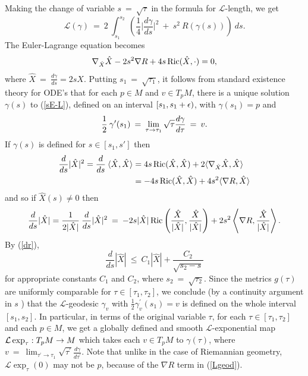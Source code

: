 Making the change of variable $s \: = \: \sqrt{\tau}$ in the formula
for ${\mathcal L}$-length, we get
\begin{equation}
\label{changetos}
{\mathcal L}(\gamma) \: = \:
2 \: \int_{s_1}^{s_2} \: \left( \frac14
\Big| \frac{d\gamma}{ds} \Big|^2 \: + \:
s^2 \: R(\gamma(s)) \right) \: ds.
\end{equation}
The Euler-Lagrange equation becomes
\begin{equation}
\label{sE-L}
\nabla_{\hat X}\hat X-2s^2\nabla R+4s\operatorname{Ric}(\hat X,\cdot)=0,
\end{equation}
where $\hat X \: = \: \frac{d\gamma}{ds}=2sX$.
Putting $s_1 \: = \: \sqrt{\tau_1}$,
it follows from standard existence theory
for ODE's that for each $p \in M$ and $v\in T_pM$,
there is a unique solution $\gamma(s)$ to
(\ref{sE-L}), defined on an interval $[s_1,s_1+\epsilon)$, with $\gamma(s_1) = p$
and
\begin{equation}
\frac{1}{2} \: \gamma^\prime(s_1) \: = \:
\lim_{\tau\rightarrow \tau_1}\sqrt{\tau}\frac{d\gamma}{d\tau} \: = \: v.
\end{equation}
If $\gamma(s)$ is defined for $s \in [s_1,s']$ then
\begin{align}
\frac{d}{ds}|\hat X|^2=\frac{d}{ds} \: \langle \hat X,\hat X\rangle
&= 4s\operatorname{Ric}(\hat X,\hat X)+2\langle\nabla_{\hat X}\hat X,\hat X\rangle \\
&= - 4s\operatorname{Ric}(\hat X,\hat X) + 4s^2 \langle \nabla R, \hat X \rangle \notag
\end{align}
and so if $\hat X (s) \neq 0$ then
\begin{equation}
\frac{d}{ds}|\hat X|=
\frac{1}{2|\hat X|} \: \frac{d}{ds}|\hat X|^2 \: = \:
- 2s |\hat X|
 \operatorname{Ric} \left( \frac{\hat X}{|\hat X|}, \frac{\hat X}{|\hat X|} \right)
+ 2s^2 \left\langle \nabla R, \frac{\hat X}{|\hat X|} \right\rangle.
\end{equation}
By (\ref{dr}),
\begin{equation}
\frac{d}{ds}|\hat X| \: \le \: C_1 |\hat X| +
\frac{C_2}{\sqrt{s_2 - s}}
\end{equation}
for appropriate constants $C_1$ and $C_2$, where
$s_2 \: = \: \sqrt{\tau_2}$.
Since the metrics $g(\tau)$
are uniformly comparable for $\tau\in [\tau_1,\tau_2]$, we conclude
(by a continuity argument
in $s$
) that the ${\mathcal L}$-geodesic $\gamma_v$
with $\frac{1}{2} \gamma_v^\prime(s_1)=v$ is defined on the whole
interval
$[s_1,s_2]$.
In particular, in terms of the original variable $\tau$,
for each
${\tau}\in [\tau_1,\tau_2]$
and each $p\in M$,
we get a globally defined and smooth ${\mathcal L}$-exponential map
${\mathcal L}\exp_\tau:T_pM\rightarrow M$ which takes each $v\in T_pM$
to $\gamma({\tau})$, where $v \: = \: \lim_{\tau^\prime \rightarrow \tau_1}
\sqrt{\tau^\prime} \frac{d\gamma}{d\tau^\prime}$.
Note that unlike in the case of Riemannian geometry,
${\mathcal L}\exp_\tau(0)$ may
not be $p$, because of the $\nabla R$ term in
(\ref{Lgeod}).

